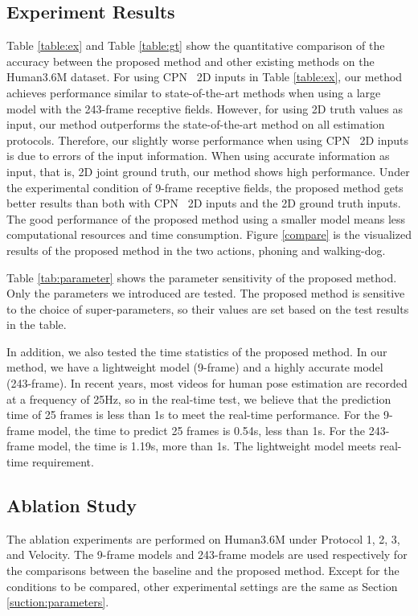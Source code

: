\documentclass[journal]{IEEEtran}
\begin{document}
\subsection{Experiment Results}
Table \ref{table:ex} and Table \ref{table:gt} show the quantitative comparison of the accuracy between the proposed method and other existing methods on the Human3.6M dataset. For using CPN~\cite{20183D} 2D inputs in Table \ref{table:ex}, our method achieves performance similar to state-of-the-art methods when using a large model with the 243-frame receptive fields. However, for using 2D truth values as input, our method outperforms the state-of-the-art method\cite{2020Anatomy} on all estimation protocols. Therefore, our slightly worse performance when using CPN~\cite{20183D} 2D inputs is due to errors of the input information. When using accurate information as input, that is, 2D joint ground truth, our method shows high performance.
Under the experimental condition of 9-frame receptive fields, the proposed method gets better results than \cite{2020Anatomy} both with CPN~\cite{20183D} 2D inputs and the 2D ground truth inputs. 
The good performance of the proposed method using a smaller model means less computational resources and time consumption. 
Figure \ref{compare} is the visualized results of the proposed method in the two actions, phoning and walking-dog.

Table \ref{tab:parameter} shows the parameter sensitivity of the proposed method. Only the parameters we introduced are tested. The proposed method is sensitive to the choice of super-parameters, so their values are set based on the test results in the table.

{In addition, we also tested the time statistics of the proposed method. In our method, we have a lightweight model (9-frame) and a highly accurate model (243-frame). In recent years, most videos for human pose estimation are recorded at a frequency of 25Hz, so in the real-time test, we believe that the prediction time of 25 frames is less than 1s to meet the real-time performance. For the 9-frame model, the time to predict 25 frames is 0.54s, less than 1s. For the 243-frame model, the time is 1.19s, more than 1s. The lightweight model meets real-time requirement.}







\subsection{Ablation Study}
\vspace{-0pt}
\label{subsec:ablation}
The ablation experiments are performed on Human3.6M under Protocol 1, 2, 3, and Velocity. The 9-frame models and 243-frame models are used respectively for the comparisons between the baseline \cite{2020Anatomy} and the proposed method. Except for the conditions to be compared, other experimental settings are the same as Section \ref{suction:parameters}.
\end{document}
